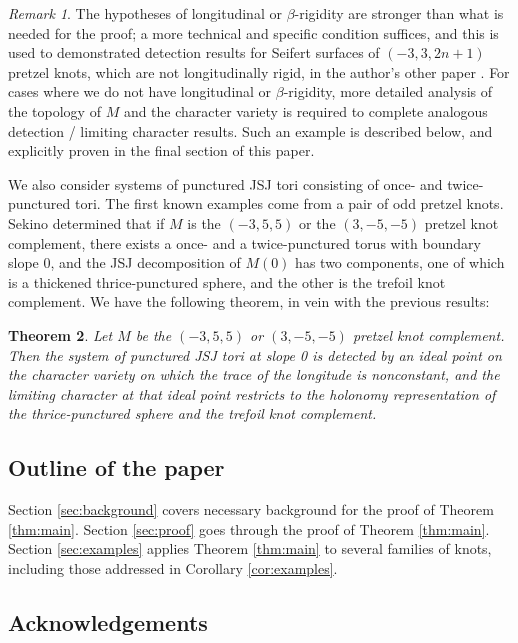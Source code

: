 \documentclass{article}
\theoremstyle{plain}
\newtheorem{theorem}{Theorem}[section]
\theoremstyle{definition}
\theoremstyle{plain}
\theoremstyle{plain}
\theoremstyle{plain}
\theoremstyle{remark}
\newtheorem{remark}[theorem]{Remark}
\theoremstyle{remark}
\theoremstyle{plain}
\theoremstyle{plain}
\begin{document}
\begin{remark}
The hypotheses of longitudinal or $\beta$-rigidity are stronger than what is needed for the proof; a more technical and specific condition suffices, and this is used to demonstrated detection results for Seifert surfaces of $(-3, 3, 2n+1)$ pretzel knots, which are not longitudinally rigid, in the author's other paper \cite{orderability}. For cases where we do not have longitudinal or $\beta$-rigidity, more detailed analysis of the topology of $M$ and the character variety is required to complete analogous detection / limiting character results. Such an example is described below, and explicitly proven in the final section of this paper. 
\end{remark}

We also consider systems of punctured JSJ tori consisting of once- and twice-punctured tori. The first known examples come from a pair of odd pretzel knots. Sekino \cite{sekino} determined that if $M$ is the $(-3, 5, 5)$ or the $(3, -5, -5)$ pretzel knot complement, there exists a once- and a twice-punctured torus with boundary slope 0, and the JSJ decomposition of $M(0)$ has two components, one of which is a thickened thrice-punctured sphere, and the other is the trefoil knot complement. We have the following theorem, in vein with the previous results:

\begin{theorem}
Let $M$ be the $(-3, 5, 5)$ or $(3, -5, -5)$ pretzel knot complement. Then the system of punctured JSJ tori at slope 0 is detected by an ideal point on the character variety on which the trace of the longitude is nonconstant, and the limiting character at that ideal point restricts to the holonomy representation of the thrice-punctured sphere and the trefoil knot complement. 
\end{theorem}

\subsection{Outline of the paper}

Section \ref{sec:background} covers necessary background for the proof of Theorem \ref{thm:main}. Section \ref{sec:proof} goes through the proof of Theorem \ref{thm:main}. Section \ref{sec:examples} applies Theorem \ref{thm:main} to several families of knots, including those addressed in Corollary \ref{cor:examples}. 

\subsection{Acknowledgements}
\end{document}
